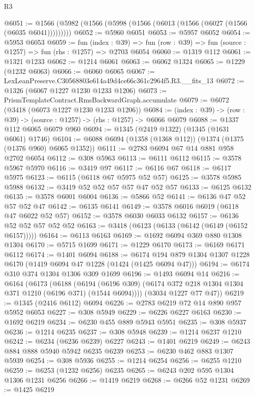 \begin{lexlean}{R3}
\begin{coremodule}
@6051 := @1566 (@5982 (@1566 (@5998 (@1566 (@6013 (@1566 (@6027 (@1566 (@6035 @6041)))))))))
@6052 := @5960 @6051
@6053 := @5957 @6052
@6054 := @5953 @6053
@6059 := fun (index : @39) =>
  fun (row : @39) => fun (source : @1257) => fun (rhs : @1257) => @2703 @6054
@6060 := @1319 @112
@6061 := @1321 @1233
@6062 := @1214 @6061
@6063 := @6062 @1324
@6065 := @1229 (@1232 @6063)
@6066 := @6060 @6065
@6067 := LexLeanPreserve.C30568803e614a49d4ce66c361c2964f5.R3.__fits_13
@6072 := @1326 (@6067 @1227 @1230 @1233 @1206)
@6073 := PrismTemplateContract.RmsBackwardGraph.accumulate
@6079 := @6072 (@3418 (@6073 @1227 @1230 @1233 @1206))
@6084 := (index : @39) -> (row : @39) -> (source : @1257) -> (rhs : @1257) -> @6066 @6079
@6088 := @1337 @112 @6065 @6079 @960
@6094 := @1345 (@2419 @1322) (@1345 (@1631 @6061) @1746)
@6104 := @6088 @6094 (@1358 (@1368 @112)) (@1374 (@1375 (@1376 @960) @6065 @1352))
@6111 := @2783 @6094 @67 @14 @881 @958 @2702 @6054
@6112 := @308 @5963
@6113 := @6111 @6112
@6115 := @3578 @5967 @5970
@6116 := @3419 @97
@6117 := @6116 @67
@6118 := @6117 @5975
@6123 := @6115 (@6118 @67 @5975 @52 @57)
@6125 := @3578 @5985 @5988
@6132 := @3419 @52 @52 @57 @57 @47 @52 @57
@6133 := @6125 @6132
@6135 := @3578 @6001 @6004
@6136 := @5866 @52
@6141 := @6136 @47 @52 @57 @52 @47
@6142 := @6135 @6141
@6149 := @3578 @6016 @6019 (@6118 @47 @6022 @52 @57)
@6152 := @3578 @6030 @6033 @6132
@6157 := @6136 @52 @52 @57 @52 @52
@6163 := @3418 (@6123 (@6133 (@6142 (@6149 (@6152 @6157)))))
@6164 := @6113 @6163
@6169 := @1692 @6094 @369 @880 @1308 @1304
@6170 := @5715 @1699
@6171 := @1229 @6170
@6173 := @6169 @6171 @6112
@6174 := @1401 @6094
@6188 := @6174 @194 @879 @1304 @1307 @1228 @6170 (@1419 @6094 @47 @1228 (@1424 (@1425 @6094 @47)))
@6194 := @6174 @310 @374 @1304 @1306 @309 @1699
@6196 := @1493 @6094 @14
@6216 := @6164
    (@6173
      (@6188
        (@6194 (@6196 @309) (@6174 @372 @218 @1304 @1304 @371 @1210 (@6196 @371) (@1544 @6094))))
      (@3034 @1227 @77 @47))
@6219 := @1345 (@2416 @6112) @6094
@6226 := @2783 @6219 @72 @14 @890 @957 @5952 @6053
@6227 := @308 @5949
@6229 := @6226 @6227 @6163
@6230 := @1692 @6219
@6234 := @6230 @455 @889 @5943 @5951
@6235 := @308 @5937
@6236 := @1214 @6235
@6237 := @308 @5948
@6239 := @1214 @6237 @1210
@6242 := @6234 (@6236 @6239) @6227
@6243 := @1401 @6219
@6249 := @6243 @884 @888 @5940 @5942 @6235 @6239
@6253 := @6230 @462 @883 @1307 @5939
@6254 := @308 @5936
@6255 := @1214 @6254
@6256 := @6255 @1210
@6259 := @6253 (@1232 @6256) @6235
@6265 := @6243 @202 @595 @1304 @1306 @1231 @6256
@6266 := @1419 @6219
@6268 := @6266 @52 @1231
@6269 := @1425 @6219

\end{coremodule}
\end{lexlean}
